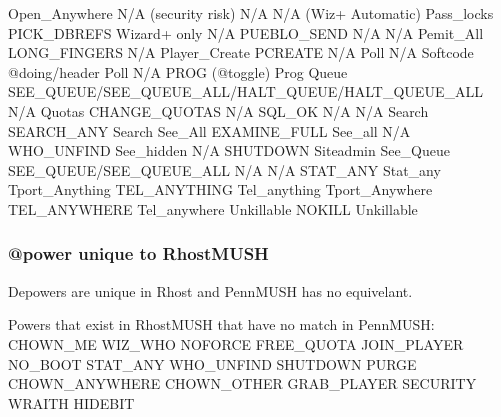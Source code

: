 \documentclass[letterpaper,10pt,english]{sphinxmanual}
\begin{document}
\begin{description}
Open\_Anywhere           N/A (security risk)                                N/A
N/A                     (Wiz+ Automatic)                                   Pass\_locks
PICK\_DBREFS             Wizard+ only                                       N/A
PUEBLO\_SEND             N/A                                                N/A
Pemit\_All               LONG\_FINGERS                                       N/A
Player\_Create           PCREATE                                            N/A
Poll                    N/A \textendash{} Softcode @doing/header                      Poll
N/A                     PROG (@toggle)                                     Prog
Queue                   SEE\_QUEUE/SEE\_QUEUE\_ALL/HALT\_QUEUE/HALT\_QUEUE\_ALL  N/A
Quotas                  CHANGE\_QUOTAS                                      N/A
SQL\_OK                  N/A                                                N/A
Search                  SEARCH\_ANY                                         Search
See\_All                 EXAMINE\_FULL                                       See\_all
N/A                     WHO\_UNFIND                                         See\_hidden
N/A                     SHUTDOWN                                           Siteadmin
See\_Queue               SEE\_QUEUE/SEE\_QUEUE\_ALL                            N/A
N/A                     STAT\_ANY                                           Stat\_any
Tport\_Anything          TEL\_ANYTHING                                       Tel\_anything
Tport\_Anywhere          TEL\_ANYWHERE                                       Tel\_anywhere
Unkillable              NOKILL                                             Unkillable

\end{description}


\subsubsection{@power unique to RhostMUSH}
\label{\detokenize{differences:power-unique-to-rhostmush}}
\sphinxAtStartPar
Depowers are unique in Rhost and PennMUSH has no equivelant.

\sphinxAtStartPar
Powers that exist in RhostMUSH that have no match in PennMUSH:
CHOWN\_ME                     WIZ\_WHO                       NOFORCE
FREE\_QUOTA                   JOIN\_PLAYER                   NO\_BOOT
STAT\_ANY                     WHO\_UNFIND                    SHUTDOWN
PURGE                        CHOWN\_ANYWHERE                CHOWN\_OTHER
GRAB\_PLAYER                  SECURITY                      WRAITH
HIDEBIT
\end{document}
